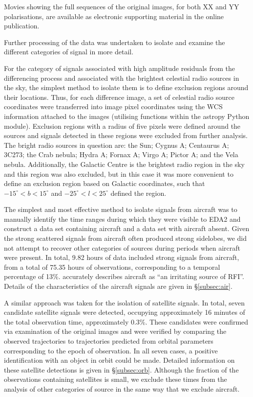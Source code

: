 Movies showing the full sequences of the original images, for both XX and YY polarisations, are available as electronic supporting material in the online publication.

Further processing of the data was undertaken to isolate and examine the different categories of signal in more detail.  

For the category of signals associated with high amplitude residuals from the differencing process and associated with the brightest celestial radio sources in the sky, the simplest method to isolate them is to define exclusion regions around their locations.  Thus, for each difference image, a set of celestial radio source coordinates were transferred into image pixel coordinates using the WCS information attached to the images (utilising functions within the astropy Python module).  Exclusion regions with a radius of five pixels were defined around the sources and signals detected in these regions were excluded from further analysis.  The bright radio sources in question are: the Sun; Cygnus A; Centaurus A; 3C273; the Crab nebula; Hydra A; Fornax A; Virgo A; Pictor A; and the Vela nebula.  Additionally, the Galactic Centre is the brightest radio region in the sky and this region was also excluded, but in this case it was more convenient to define an exclusion region based on Galactic coordinates, such that $-15^{\circ}<b<15^{\circ}$ and $-25^{\circ}<l<25^{\circ}$ defined the region.

The simplest and most effective method to isolate signals from aircraft was to manually identify the time ranges during which they were visible to EDA2 and construct a data set containing aircraft and a data set with aircraft absent.  Given the strong scattered signals from aircraft often produced strong sidelobes, we did not attempt to recover other categories of sources during periods when aircraft were present.  In total, 9.82 hours of data included strong signals from aircraft, from a total of 75.35 hours of observations, corresponding to a temporal percentage of 13\%.  \citet{https://doi.org/10.7907/25dp-j474} accurately describes aircraft as ``an irritating source of RFI''.  Details of the characteristics of the aircraft signals are given in \S \ref{subsec:air}.

A similar approach was taken for the isolation of satellite signals.  In total, seven candidate satellite signals were detected, occupying approximately 16 minutes of the total observation time, approximately 0.3\%.  These candidates were confirmed via examination of the original images and were verified by comparing the observed trajectories to trajectories predicted from orbital parameters corresponding to the epoch of observation.  In all seven cases, a positive identification with an object in orbit could be made.  Detailed information on these satellite detections is given in \S \ref{subsec:orb}.  Although the fraction of the observations containing satellites is small, we exclude these times from the analysis of other categories of source in the same way that we exclude aircraft.

